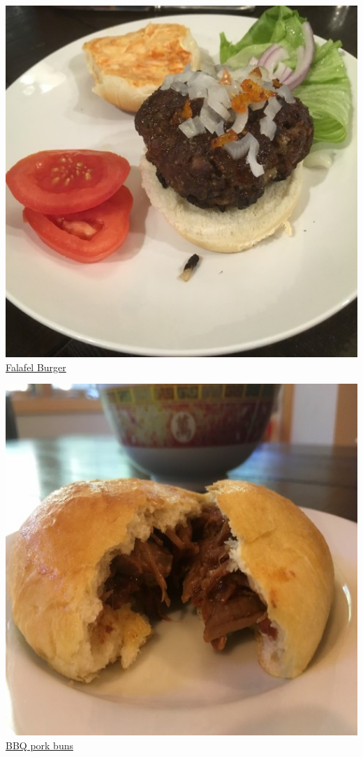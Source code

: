 \documentclass[
]{book}
\begin{document}
\protect\hyperlink{burger}{\includegraphics[width=1\textwidth,height=\textheight]{falafel_burger_small.jpg}}
\protect\hyperlink{burger}{Falafel Burger}

\protect\hyperlink{bbq}{\includegraphics[width=1\textwidth,height=\textheight]{bbq_pork_buns_small.jpg}}
\protect\hyperlink{bbq}{BBQ pork buns}
\end{document}
